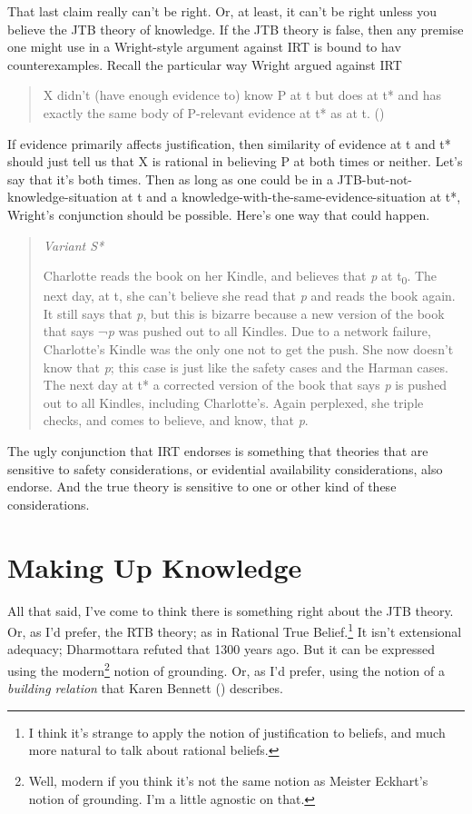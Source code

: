 \documentclass[
  12pt,
  letterpaper,
]{scrbook}
\begin{document}
That last claim really can't be right. Or, at least, it can't be right
unless you believe the JTB theory of knowledge. If the JTB theory is
false, then any premise one might use in a Wright-style argument against
IRT is bound to hav counterexamples. Recall the particular way Wright
argued against IRT

\begin{quote}
X didn't (have enough evidence to) know P at t but does at t* and has
exactly the same body of P-relevant evidence at t* as at t.
()
\end{quote}

If evidence primarily affects justification, then similarity of evidence
at t and t* should just tell us that X is rational in believing P at
both times or neither. Let's say that it's both times. Then as long as
one could be in a JTB-but-not-knowledge-situation at t and a
knowledge-with-the-same-evidence-situation at t*, Wright's conjunction
should be possible. Here's one way that could happen.

\begin{quote}
\emph{Variant S*}

Charlotte reads the book on her Kindle, and believes that \emph{p} at
t\textsubscript{0}. The next day, at t, she can't believe she read that
\emph{p} and reads the book again. It still says that \emph{p}, but this
is bizarre because a new version of the book that says ¬\emph{p} was
pushed out to all Kindles. Due to a network failure, Charlotte's Kindle
was the only one not to get the push. She now doesn't know that
\emph{p}; this case is just like the safety cases and the Harman cases.
The next day at t* a corrected version of the book that says \emph{p} is
pushed out to all Kindles, including Charlotte's. Again perplexed, she
triple checks, and comes to believe, and know, that \emph{p}.
\end{quote}

The ugly conjunction that IRT endorses is something that theories that
are sensitive to safety considerations, or evidential availability
considerations, also endorse. And the true theory is sensitive to one or
other kind of these considerations.

\section{Making Up Knowledge}\label{sec-building}

All that said, I've come to think there is something right about the JTB
theory. Or, as I'd prefer, the RTB theory; as in Rational True
Belief.\footnote{I think it's strange to apply the notion of
  justification to beliefs, and much more natural to talk about rational
  beliefs.} It isn't extensional adequacy; Dharmottara refuted that 1300
years ago. But it can be expressed using the modern\footnote{Well,
  modern if you think it's not the same notion as Meister Eckhart's
  notion of grounding. I'm a little agnostic on that.} notion of
grounding. Or, as I'd prefer, using the notion of a \emph{building
relation} that Karen Bennett ()
describes.
\end{document}
